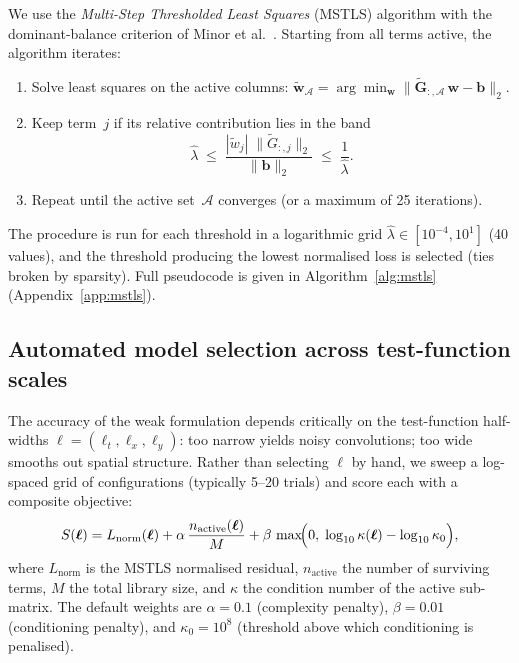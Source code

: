 \documentclass{report}
\theoremstyle{plain}
\theoremstyle{remark}
\numberwithin{equation}{section}              %
\begin{document}
We use the \emph{Multi-Step Thresholded Least Squares} (MSTLS) algorithm
with the dominant-balance criterion of Minor et al.~\cite{minor2025mstls}.
Starting from all terms active, the algorithm iterates:
\begin{enumerate}[nosep]
\item Solve least squares on the active columns:
      $\tilde{\mathbf{w}}_{\mathcal{A}}
       = \arg\min_{\mathbf{w}}
         \lVert\tilde{\mathbf{G}}_{:,\mathcal{A}}\,\mathbf{w}
               -\mathbf{b}\rVert_2$.
\item Keep term~$j$ if its relative contribution lies in the band
      \begin{equation}
        \hat\lambda
        \;\le\;
        \frac{|\tilde{w}_j|\;\lVert\tilde{G}_{:,j}\rVert_2}
             {\lVert\mathbf{b}\rVert_2}
        \;\le\;
        \frac{1}{\hat\lambda}.
        \label{eq:dominant_balance}
      \end{equation}
\item Repeat until the active set~$\mathcal{A}$ converges
      (or a maximum of 25 iterations).
\end{enumerate}
The procedure is run for each threshold in a logarithmic grid
$\hat\lambda\in[10^{-4},10^1]$ (40 values), and the threshold
producing the lowest normalised loss is selected (ties broken
by sparsity).  Full pseudocode is given in
Algorithm~\ref{alg:mstls} (Appendix~\ref{app:mstls}).

\subsection{Automated model selection across test-function scales}
\label{subsec:model_selection}

The accuracy of the weak formulation depends critically on the test-function
half-widths $\boldsymbol\ell=(\ell_t,\ell_x,\ell_y)$: too narrow yields
noisy convolutions; too wide smooths out spatial structure.  Rather than
selecting $\boldsymbol\ell$ by hand, we sweep a log-spaced grid of
configurations (typically 5--20 trials) and score each with a composite
objective:
\begin{equation}
  S(\boldsymbol\ell)
  = L_{\mathrm{norm}}(\boldsymbol\ell)
  + \alpha\,\frac{n_{\mathrm{active}}(\boldsymbol\ell)}{M}
  + \beta\,\max\!\Bigl(0,\;
      \log_{10}\kappa(\boldsymbol\ell)
      - \log_{10}\kappa_0\Bigr),
  \label{eq:composite_score}
\end{equation}
where $L_{\mathrm{norm}}$ is the MSTLS normalised residual,
$n_{\mathrm{active}}$ the number of surviving terms, $M$ the total library
size, and $\kappa$ the condition number of the active sub-matrix.  The
default weights are $\alpha=0.1$ (complexity penalty), $\beta=0.01$
(conditioning penalty), and $\kappa_0=10^8$ (threshold above which
conditioning is penalised).
\end{document}
